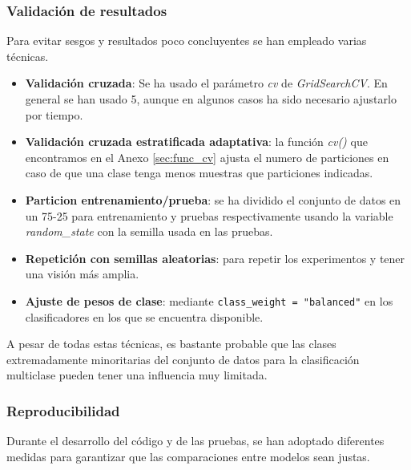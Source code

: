 \subsubsection{Validación de resultados}
\label{subsubsec:validacion}

Para evitar sesgos y resultados poco concluyentes se han empleado varias técnicas.

\begin{itemize}
	\item \textbf{Validación cruzada}: Se ha usado el parámetro \textit{cv} de \textit{GridSearchCV}. En general se han usado 5, aunque en algunos casos ha sido necesario ajustarlo por tiempo.
	\item \textbf{Validación cruzada estratificada adaptativa}: la función \textit{cv()} que encontramos en el Anexo \ref{sec:func_cv} ajusta el numero de particiones en caso de que una clase tenga menos muestras que particiones indicadas.
	\item \textbf{Particion entrenamiento/prueba}: se ha dividido el conjunto de datos en un 75-25 para entrenamiento y pruebas respectivamente usando la variable \textit{random\_state} con la semilla usada en las pruebas.
	\item \textbf{Repetición con semillas aleatorias}: para repetir los experimentos y tener una visión más amplia.
	\item \textbf{Ajuste de pesos de clase}: mediante \texttt{class\_weight = "balanced"} en los clasificadores en los que se encuentra disponible.
\end{itemize}

A pesar de todas estas técnicas, es bastante probable que las clases extremadamente minoritarias del conjunto de datos para la clasificación multiclase pueden tener una influencia muy limitada.

\subsubsection{Reproducibilidad}
\label{subsubsec:reproducibilidad}

Durante el desarrollo del código y de las pruebas, se han adoptado diferentes medidas para garantizar que las comparaciones entre modelos sean justas.

